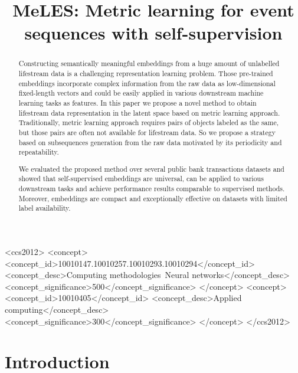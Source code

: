 \documentclass[sigconf, anonymous]{acmart}
\begin{document}
\title{MeLES: Metric learning for event sequences with self-supervision}

\begin{abstract}

Constructing semantically meaningful embeddings from a huge amount of unlabelled lifestream data is a challenging representation learning problem. Those pre-trained embeddings incorporate complex information from the raw data as low-dimensional fixed-length vectors and could be easily applied in various downstream machine learning tasks as features. In this paper we propose a novel method to obtain lifestream data representation in the latent space based on metric learning approach. Traditionally, metric learning approach requires pairs of objects labeled as the same, but those pairs are often not available for lifestream data. So we propose a strategy based on subsequences generation from the raw data motivated by its periodicity and repeatability. 

We evaluated the proposed method over several public bank transactions datasets and showed that self-supervised embeddings are universal, can be applied to various downstream tasks and achieve performance results comparable to supervised methods. Moreover, embeddings are compact and exceptionally effective on datasets with limited label availability. 


\end{abstract}

\begin{CCSXML}
<ccs2012>
<concept>
<concept_id>10010147.10010257.10010293.10010294</concept_id>
<concept_desc>Computing methodologies~Neural networks</concept_desc>
<concept_significance>500</concept_significance>
</concept>
<concept>
<concept_id>10010405</concept_id>
<concept_desc>Applied computing</concept_desc>
<concept_significance>300</concept_significance>
</concept>
</ccs2012>
\end{CCSXML}



\maketitle

\section{Introduction}
\end{document}

